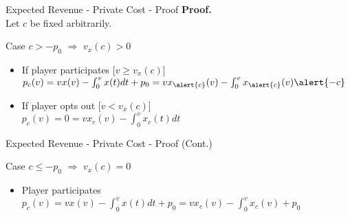 \documentclass{beamer}
\begin{document}
\begin{frame}{Expected Revenue - Private Cost - Proof}
  \textbf{Proof.}\\

  Let $c$ be fixed arbitrarily.

  Case $c > -p_0$ $\Rightarrow$ $v_x(c) > 0$ \\
  \begin{itemize}
    \item<2-> If player participates [$v \geq v_x(c)$]\\
      $p_c(v) = v x(v) - \int_0^vx(t)dt + p_0 = v x_{\alert{c}}(v) - \int_0^v x_{\alert{c}}(v) \alert{- c}$ \\
    \item<3-> If player opts out [$v < v_x(c)$]\\
      $p_c(v) = 0 = v x_c(v) - \int_0^v x_c(t) dt$
  \end{itemize}


\end{frame}
\begin{frame}{Expected Revenue - Private Cost - Proof (Cont.)}

  Case $c \leq -p_0$ $\Rightarrow$ $v_x(c) = 0$ \\
  \begin{itemize}
    \item<2-> Player participates \\
      $p_c(v) = v x(v) - \int_0^vx(t)dt + p_0 = v x_c(v) - \int_0^v x_c(v) + p_0$ \\
  \end{itemize}


\end{frame}
\end{document}
